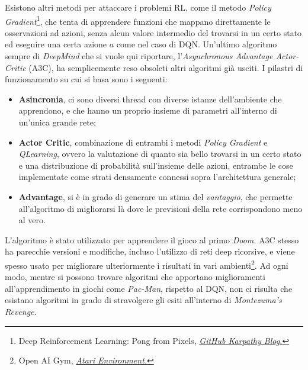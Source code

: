 \documentclass[twoside,twocolumn,10pt]{extarticle}
\theoremstyle{definition}
\begin{document}
	Esistono altri metodi per attaccare i problemi RL, come il metodo \textit{Policy Gradient}\footnote{Deep Reinforcement Learning: Pong from Pixels, \emph{\href{http://karpathy.github.io/2016/05/31/rl/}{GitHub Karpathy Blog.}}}, che tenta di apprendere funzioni che mappano direttamente le osservazioni ad azioni, senza alcun valore intermedio del trovarsi in un certo stato ed eseguire una certa azione $a$ come nel caso di DQN. Un'ultimo algoritmo sempre di \textit{DeepMind} che si vuole qui riportare, l'\textit{Asynchronous Advantage Actor-Critic}\cite{bib:a3c} (A3C), ha semplicemente reso obsoleti altri algoritmi già usciti. I pilastri di funzionamento su cui si basa sono i seguenti:
	\begin{itemize}
		\item \textbf{Asincronia}, ci sono diversi thread con diverse istanze dell'ambiente che apprendono, e che hanno un proprio insieme di parametri all'interno di un'unica grande rete;
		\item \textbf{Actor Critic}, combinazione di entrambi i metodi \textit{Policy Gradient} e \textit{Q\texttwelveudash Learning}, ovvero la valutazione di quanto sia bello trovarsi in un certo stato e una distribuzione di probabilità sull'insieme delle azioni, entrambe le cose implementate come strati densamente connessi sopra l'architettura generale;
		\item \textbf{Advantage}, si è in grado di generare un stima del \textit{vantaggio}, che permette all'algoritmo di migliorarsi là dove le previsioni della rete corrispondono meno al vero.
	\end{itemize}
	L'algoritmo è stato utilizzato per apprendere il gioco al primo \textit{Doom}. A3C stesso ha parecchie versioni e modifiche, incluso l'utilizzo di reti deep ricorsive, e viene spesso usato per migliorare ulteriormente i risultati in vari ambienti\footnote{Open AI Gym, \emph{\href{https://gym.openai.com/envs\#atari}{Atari Environment.}}}. Ad ogni modo, mentre si possono trovare algoritmi che apportano miglioramenti all'apprendimento in giochi come \textit{Pac-Man}, rispetto al DQN, non ci risulta che esistano algoritmi in grado di stravolgere gli esiti all'interno di \textit{Montezuma's Revenge}.
\end{document}
